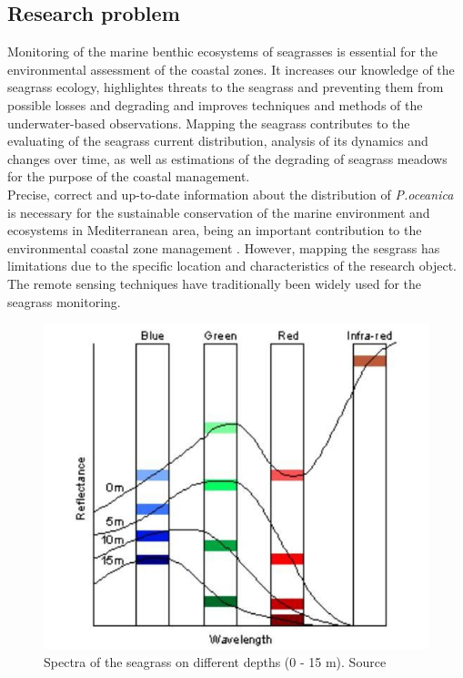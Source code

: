 \documentclass[10pt, a4paper]{article}
\begin{document}
\subsection{Research problem}
Monitoring of the marine benthic ecosystems of seagrasses is essential for the environmental
assessment of the coastal zones. It increases our knowledge of the seagrass ecology, highlightes
threats to the seagrass and preventing them from possible losses and degrading and improves
techniques and methods of the underwater-based observations. Mapping the seagrass contributes to
the evaluating of the seagrass current distribution, analysis of its dynamics and changes over time, as
well as estimations of the degrading of seagrass meadows for the purpose of the coastal management.\\
Precise, correct and up-to-date information about the distribution of \textit{P.oceanica} is necessary for the
sustainable conservation of the marine environment and ecosystems in Mediterranean area, being an
important contribution to the environmental coastal zone management \cite{Pergent-Martini06}\label{Pergent-Martini06}.
However, mapping the sesgrass has limitations due to the specific location and characteristics of the
research object. The remote sensing techniques have traditionally been widely used for the seagrass
monitoring. 

\begin{figure}
\centering
\includegraphics[scale=0.25]{Fig-1-9.jpg}
\caption{Spectra of the seagrass on different
depths (0 - 15 m). Source \cite{Edwards00}\label{Edwards00}}
\label{fig:9}
\end{figure}
\end{document}
